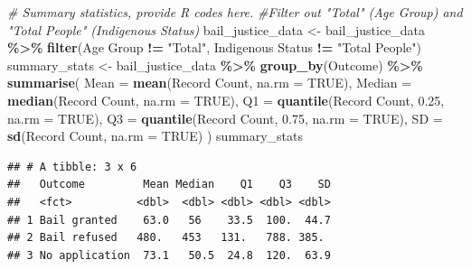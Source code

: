 \documentclass[
]{article}
\newenvironment{Shaded}{\begin{snugshade}}{\end{snugshade}}
\newcommand{\AttributeTok}[1]{\textcolor[rgb]{0.13,0.29,0.53}{#1}}
\newcommand{\CommentTok}[1]{\textcolor[rgb]{0.56,0.35,0.01}{\textit{#1}}}
\newcommand{\ConstantTok}[1]{\textcolor[rgb]{0.56,0.35,0.01}{#1}}
\newcommand{\FloatTok}[1]{\textcolor[rgb]{0.00,0.00,0.81}{#1}}
\newcommand{\FunctionTok}[1]{\textcolor[rgb]{0.13,0.29,0.53}{\textbf{#1}}}
\newcommand{\NormalTok}[1]{#1}
\newcommand{\OtherTok}[1]{\textcolor[rgb]{0.56,0.35,0.01}{#1}}
\newcommand{\SpecialCharTok}[1]{\textcolor[rgb]{0.81,0.36,0.00}{\textbf{#1}}}
\newcommand{\StringTok}[1]{\textcolor[rgb]{0.31,0.60,0.02}{#1}}
\begin{document}
\begin{Shaded}
\begin{Highlighting}[]
\CommentTok{\# Summary statistics, provide R codes here.}
\CommentTok{\#Filter out "Total" (Age Group) and "Total People" (Indigenous Status)}
\NormalTok{bail\_justice\_data }\OtherTok{\textless{}{-}}\NormalTok{ bail\_justice\_data }\SpecialCharTok{\%\textgreater{}\%}
\FunctionTok{filter}\NormalTok{(}\StringTok{\textasciigrave{}}\AttributeTok{Age Group}\StringTok{\textasciigrave{}} \SpecialCharTok{!=} \StringTok{"Total"}\NormalTok{, }\StringTok{\textasciigrave{}}\AttributeTok{Indigenous Status}\StringTok{\textasciigrave{}} \SpecialCharTok{!=} \StringTok{"Total People"}\NormalTok{)}
\NormalTok{summary\_stats }\OtherTok{\textless{}{-}}\NormalTok{ bail\_justice\_data }\SpecialCharTok{\%\textgreater{}\%}
  \FunctionTok{group\_by}\NormalTok{(Outcome) }\SpecialCharTok{\%\textgreater{}\%}
  \FunctionTok{summarise}\NormalTok{(}
    \AttributeTok{Mean =} \FunctionTok{mean}\NormalTok{(}\StringTok{\textasciigrave{}}\AttributeTok{Record Count}\StringTok{\textasciigrave{}}\NormalTok{, }\AttributeTok{na.rm =} \ConstantTok{TRUE}\NormalTok{),}
    \AttributeTok{Median =} \FunctionTok{median}\NormalTok{(}\StringTok{\textasciigrave{}}\AttributeTok{Record Count}\StringTok{\textasciigrave{}}\NormalTok{, }\AttributeTok{na.rm =} \ConstantTok{TRUE}\NormalTok{),}
    \AttributeTok{Q1 =} \FunctionTok{quantile}\NormalTok{(}\StringTok{\textasciigrave{}}\AttributeTok{Record Count}\StringTok{\textasciigrave{}}\NormalTok{, }\FloatTok{0.25}\NormalTok{, }\AttributeTok{na.rm =} \ConstantTok{TRUE}\NormalTok{),}
    \AttributeTok{Q3 =} \FunctionTok{quantile}\NormalTok{(}\StringTok{\textasciigrave{}}\AttributeTok{Record Count}\StringTok{\textasciigrave{}}\NormalTok{, }\FloatTok{0.75}\NormalTok{, }\AttributeTok{na.rm =} \ConstantTok{TRUE}\NormalTok{),}
    \AttributeTok{SD =} \FunctionTok{sd}\NormalTok{(}\StringTok{\textasciigrave{}}\AttributeTok{Record Count}\StringTok{\textasciigrave{}}\NormalTok{, }\AttributeTok{na.rm =} \ConstantTok{TRUE}\NormalTok{)}
\NormalTok{  )}
\NormalTok{summary\_stats}
\end{Highlighting}
\end{Shaded}

\begin{verbatim}
## # A tibble: 3 x 6
##   Outcome         Mean Median    Q1    Q3    SD
##   <fct>          <dbl>  <dbl> <dbl> <dbl> <dbl>
## 1 Bail granted    63.0   56    33.5  100.  44.7
## 2 Bail refused   480.   453   131.   788. 385. 
## 3 No application  73.1   50.5  24.8  120.  63.9
\end{verbatim}
\end{document}
